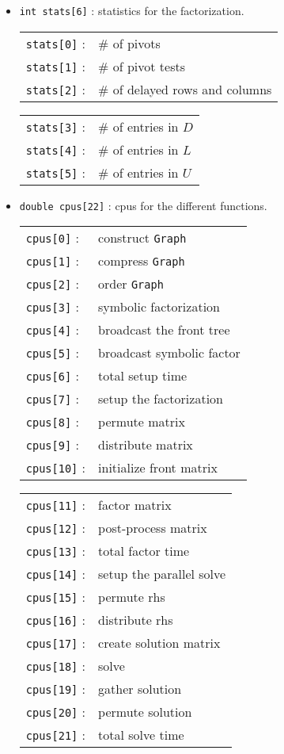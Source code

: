 \begin{itemize}
\begin{itemize}
{\tt FILE *msgFile} : message file for output.
When \texttt{msglvl} $>$ 0, \texttt{msgFile} must not be \texttt{NULL}.
\item
{\tt int stats[6]} : statistics for the factorization.
\begin{center}
\begin{tabular}{ll}
\texttt{stats[0]} : & \# of pivots \\
\texttt{stats[1]} : & \# of pivot tests \\
\texttt{stats[2]} : & \# of delayed rows and columns
\end{tabular}
\begin{tabular}{ll}
\texttt{stats[3]} : & \# of entries in $D$ \\
\texttt{stats[4]} : & \# of entries in $L$ \\
\texttt{stats[5]} : & \# of entries in $U$
\end{tabular}
\end{center}
\item
{\tt double cpus[22]} : cpus for the different functions.
\begin{center}
\begin{tabular}{ll}
\texttt{cpus[0]} : & construct \texttt{Graph} \\
\texttt{cpus[1]} : & compress \texttt{Graph} \\
\texttt{cpus[2]} : & order \texttt{Graph} \\
\texttt{cpus[3]} : & symbolic factorization \\
\texttt{cpus[4]} : & broadcast the front tree \\
\texttt{cpus[5]} : & broadcast symbolic factor \\
\texttt{cpus[6]} : & total setup time \\
\texttt{cpus[7]} : & setup the factorization \\
\texttt{cpus[8]} : & permute matrix \\
\texttt{cpus[9]} : & distribute matrix \\
\texttt{cpus[10]} : & initialize front matrix 
\end{tabular}
\begin{tabular}{ll}
\texttt{cpus[11]} : & factor matrix \\
\texttt{cpus[12]} : & post-process matrix \\
\texttt{cpus[13]} : & total factor time \\
\texttt{cpus[14]} : & setup the parallel solve \\
\texttt{cpus[15]} : & permute rhs \\
\texttt{cpus[16]} : & distribute rhs \\
\texttt{cpus[17]} : & create solution matrix \\
\texttt{cpus[18]} : & solve \\
\texttt{cpus[19]} : & gather solution \\
\texttt{cpus[20]} : & permute solution \\
\texttt{cpus[21]} : & total solve time
\end{tabular}
\end{center}
\end{itemize}
\end{itemize}
\par
